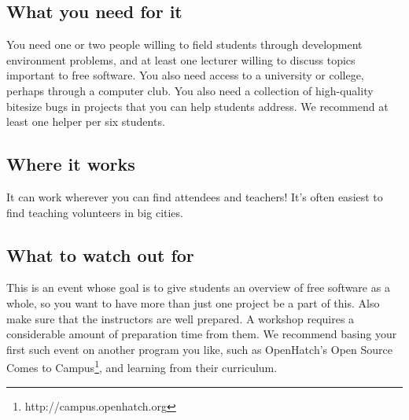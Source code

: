 \subsection{What you need for it}
You need one or two people willing to field students through development environment problems, and at least one lecturer willing to discuss topics important to free software. You also need access to a university or college, perhaps through a computer club. You also need a collection of high-quality bitesize bugs in projects that you can help students address. We recommend at least one helper per six students.

\subsection{Where it works}
It can work wherever you can find attendees and teachers! It’s often easiest to find teaching volunteers in big cities.

\subsection{What to watch out for}
This is an event whose goal is to give students an overview of free software as a whole, so you want to have more than just one project be a part of this. Also make sure that the instructors are well prepared. A workshop requires a considerable amount of preparation time from them. We recommend basing your first such event on another program you like, such as OpenHatch’s Open Source Comes to Campus\footnote{{http://campus.openhatch.org}}, and learning from their curriculum.